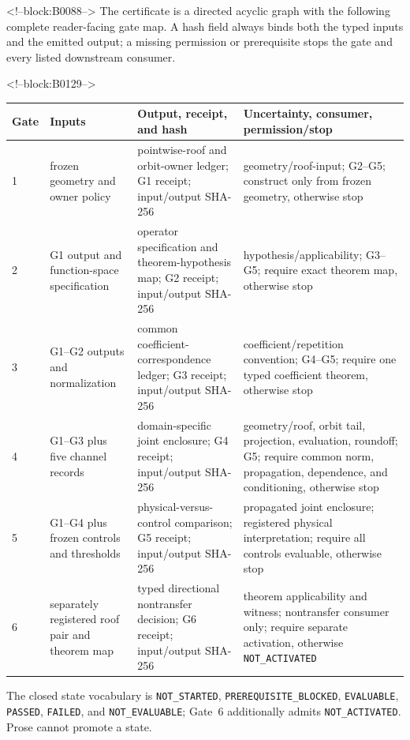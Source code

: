 \documentclass[11pt,a4paper]{article}
\begin{document}
<!--block:B0088-->
The certificate is a directed acyclic graph with the following complete
reader-facing gate map.  A hash field always binds both the typed inputs and the
emitted output; a missing permission or prerequisite stops the gate and every
listed downstream consumer.

<!--block:B0129-->
\begin{center}
\scriptsize
\begin{tabularx}{\linewidth}{@{}l p{.19\linewidth} p{.27\linewidth} X@{}}
\toprule
Gate & Inputs & Output, receipt, and hash & Uncertainty, consumer, permission/stop \\
\midrule
1 & frozen geometry and owner policy & pointwise-roof and orbit-owner ledger; G1 receipt; input/output SHA-256 & geometry/roof-input; G2--G5; construct only from frozen geometry, otherwise stop \\
2 & G1 output and function-space specification & operator specification and theorem-hypothesis map; G2 receipt; input/output SHA-256 & hypothesis/applicability; G3--G5; require exact theorem map, otherwise stop \\
3 & G1--G2 outputs and normalization & common coefficient-correspondence ledger; G3 receipt; input/output SHA-256 & coefficient/repetition convention; G4--G5; require one typed coefficient theorem, otherwise stop \\
4 & G1--G3 plus five channel records & domain-specific joint enclosure; G4 receipt; input/output SHA-256 & geometry/roof, orbit tail, projection, evaluation, roundoff; G5; require common norm, propagation, dependence, and conditioning, otherwise stop \\
5 & G1--G4 plus frozen controls and thresholds & physical-versus-control comparison; G5 receipt; input/output SHA-256 & propagated joint enclosure; registered physical interpretation; require all controls evaluable, otherwise stop \\
6 & separately registered roof pair and theorem map & typed directional nontransfer decision; G6 receipt; input/output SHA-256 & theorem applicability and witness; nontransfer consumer only; require separate activation, otherwise \texttt{NOT\_\allowbreak ACTIVATED} \\
\bottomrule
\end{tabularx}
\end{center}
The closed state vocabulary is \texttt{NOT\_\allowbreak STARTED},
\texttt{PREREQUISITE\_\allowbreak BLOCKED}, \texttt{EVALUABLE}, \texttt{PASSED},
\texttt{FAILED}, and \texttt{NOT\_\allowbreak EVALUABLE}; Gate~6 additionally admits
\texttt{NOT\_\allowbreak ACTIVATED}.  Prose cannot promote a state.
\end{document}

